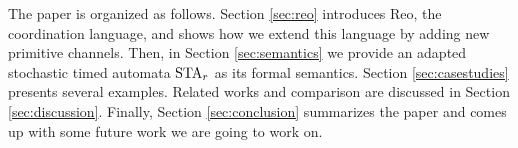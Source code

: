The paper is organized as follows. Section \ref{sec:reo} introduces Reo, the coordination language, and shows how we extend this language by adding new primitive channels. Then, in Section \ref{sec:semantics} we provide an adapted stochastic timed automata $\mbox{STA}_r$ as its formal semantics. Section \ref{sec:casestudies} presents several examples. Related works and comparison are discussed in Section \ref{sec:discussion}. Finally, Section \ref{sec:conclusion} summarizes the paper and comes up with some future work we are going to work on.
